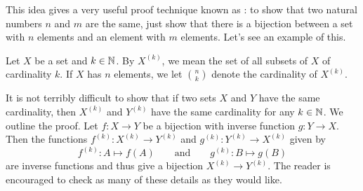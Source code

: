 \documentclass[../notes.tex]{subfiles}
\begin{document}
This idea gives a very useful proof technique known as : to show that two natural numbers $n$ and $m$ are the same, just show that there is a bijection between a set with $n$ elements and an element with $m$ elements. Let's see an example of this.
\begin{definition}
    Let $X$ be a set and $k \in \mathbb N$. By $X^{(k)}$, we mean the set of all subsets of $X$ of cardinality $k$. If $X$ has $n$ elements, we let $\binom nk$ denote the cardinality of $X^{(k)}$.
\end{definition}
\begin{remark}
    It is not terribly difficult to show that if two sets $X$ and $Y$ have the same cardinality, then $X^{(k)}$ and $Y^{(k)}$ have the same cardinality for any $k\in\mathbb N$. We outline the proof. Let $f\colon X\to Y$ be a bijection with inverse function $g\colon Y\to X$. Then the functions $f^{(k)}\colon X^{(k)}\to Y^{(k)}$ and $g^{(k)}\colon Y^{(k)}\to X^{(k)}$ given by
    \[f^{(k)}\colon A\mapsto f(A)\qquad\text{and}\qquad g^{(k)}\colon B\mapsto g(B)\]
    are inverse functions and thus give a bijection $X^{(k)}\to Y^{(k)}$. The reader is encouraged to check as many of these details as they would like.
\end{remark}
\end{document}
